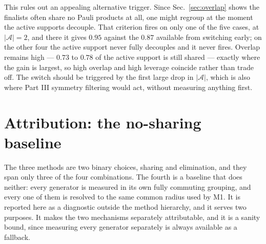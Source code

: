 \documentclass[10pt]{article}
\begin{document}
This rules out an appealing alternative trigger. Since Sec.~\ref{sec:overlap}
shows the finalists often share no Pauli products at all, one might regroup at the
moment the active supports decouple. That criterion fires on only one of the five
cases, at $|\mathcal A|=2$, and there it gives $0.95$ against the $0.87$ available
from switching early; on the other four the active support never fully decouples
and it never fires. Overlap remains high --- $0.73$ to $0.78$ of the active support
is still shared --- exactly where the gain is largest, so high overlap and high
leverage coincide rather than trade off. The switch should be triggered by the
first large drop in $|\mathcal A|$, which is also where Part III symmetry
filtering would act, without measuring anything first.

\section{Attribution: the no-sharing baseline}
\label{sec:baseline}

The three methods are two binary choices, sharing and elimination, and they span
only three of the four combinations. The fourth is a baseline that does neither:
every generator is measured in its own fully commuting grouping, and every one of
them is resolved to the same common radius used by M1. It is reported here as a
diagnostic outside the method hierarchy, and it serves two purposes. It makes the
two mechanisms separately attributable, and it is a sanity bound, since measuring
every generator separately is always available as a fallback.
\end{document}
